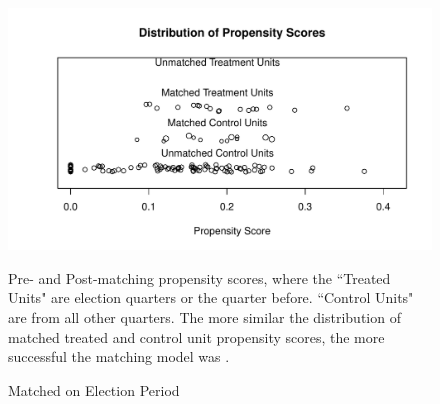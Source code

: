\documentclass[a4paper]{article}\usepackage[]{graphicx}\usepackage[]{color}
\makeatletter
\def\maxwidth{ %
  \ifdim\Gin@nat@width>\linewidth
    \linewidth
  \else
    \Gin@nat@width
  \fi
}
\newenvironment{knitrout}{}{} %
\makeatother
\begin{document}
\begin{figure}[h]
  \caption{Matched on Election Period}
  \label{ElectPropensityScores}
\begin{knitrout}
\color{fgcolor}

{\centering \includegraphics[width=\maxwidth]{figure/ElectPropensity} 

}



\end{knitrout}

    \begin{singlespace}
        {\scriptsize{Pre- and Post-matching propensity scores, where the ``Treated Units" are election quarters or the quarter before. ``Control Units" are from all other quarters. The more similar the distribution of matched treated and control unit propensity scores, the more successful the matching model was \cite[17]{Hollyer2012}.}}
    \end{singlespace}
\end{figure}
\end{document}
